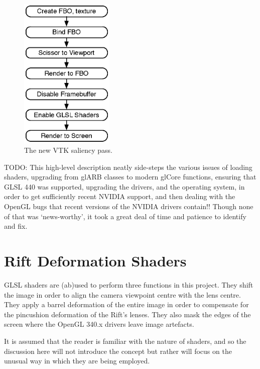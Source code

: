 \documentclass[MSc,paper=a4,pagesize=auto]{icldt}
\begin{document}
\begin{figure}[htbp!]
    \centering
    \includegraphics[width=0.4\textwidth]{resources/vtk_saliency}
    \caption{The new VTK saliency pass.}
    \label{fig:vtk_saliency}
\end{figure}

TODO: This high-level description neatly side-steps the various issues of loading shaders, upgrading from glARB classes to modern glCore functions, ensuring that GLSL 440 was supported, upgrading the drivers, and the operating system, in order to get sufficiently recent NVIDIA support, and then dealing with the OpenGL bugs that recent versions of the NVIDIA drivers contain!! Though none of that was `news-worthy', it took a great deal of time and patience to identify and fix. 

\section{Rift Deformation Shaders}
GLSL shaders are (ab)used to perform three functions in this project. They shift the image in order to align the camera viewpoint centre with the lens centre. They apply a barrel deformation of the entire image in order to compensate for the pincushion deformation of the Rift's lenses.  They also mask the edges of the screen where the OpenGL 340.x drivers leave image artefacts. 


It is assumed that the reader is familiar with the nature of shaders, and so the discussion here will not introduce the concept but rather will focus on the unusual way in which they are being employed. 
\end{document}
